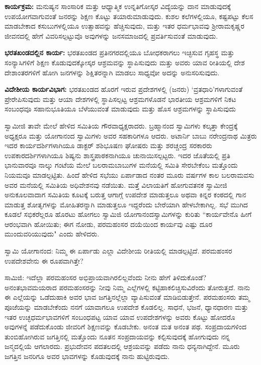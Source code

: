 \textbf{ಕಾರ್ಯಕ್ರಮ:} ಮನುಷ್ಯನ ಸಾಂಸಾರಿಕ ಮತ್ತು ಆಧ್ಯಾತ್ಮಿಕ ಉನ್ನತಿಗೋಸ್ಕರ ವಿದ್ಯೆಯನ್ನು ದಾನ ಮಾಡುವುದಕ್ಕೆ ಉಪಯೋಗವಾಗುವಂತೆ ಜನರನ್ನು ಶಿಕ್ಷಣ ಕೊಟ್ಟು ತಯಾರುಮಾಡುವುದು. ಕುಶಲ ಕಲೆಗಳಲ್ಲಿಯೂ, ಕಷ್ಟಪಟ್ಟು ಕೆಲಸ ಮಾಡಬೇಕಾದ ಕಸುಬುಗಳಲ್ಲಿಯೂ ಉತ್ಸಾಹವನ್ನು ಹೆಚ್ಚಿಸುವುದು, ಮತ್ತು ಇತರ ಧರ್ಮಭಾವವು ಶ‍್ರೀರಾಮಕೃಷ್ಣರ ಜೀವನದಲ್ಲಿ ಹೇಗೆ ವಿವರಿಸಲ್ಪಟ್ಟುವೊ ಅವುಗಳನ್ನು ಜನಸಮಾಜದಲ್ಲಿ ಪ್ರವರ್ತಿಸುವಂತೆ ಮಾಡುವುದು.

\textbf{ಭರತಖಂಡದಲ್ಲಿನ ಕಾರ್ಯ:} ಭರತಖಂಡದ ಪ್ರತಿನಗರದಲ್ಲಿಯೂ ಬೋಧಕರಾಗಲು ಇಚ್ಛಿಸುವ ಗೃಹಸ್ಥ ಮತ್ತು ಸಂನ್ಯಾಸಿಗಳಿಗೆ ಶಿಕ್ಷಣ ಕೊಡುವುದಕ್ಕೋಸ್ಕರ ಆಶ್ರಮವನ್ನು ಸ್ಥಾಪಿಸುವುದು ಮತ್ತು ಅವರು ಯಾವ ರೀತಿಯಲ್ಲಿ ದೇಶ ದೇಶಾಂತರಗಳಿಗೆ ಹೋಗಿ ಜನಗಳನ್ನು ಶಿಕ್ಷಿತರನ್ನಾಗಿ ಮಾಡಲು ಸಾಧ್ಯವೋ ಅದನ್ನು ಅನುಸರಿಸುವುದು.

\textbf{ವಿದೇಶೀಯ ಕಾರ್ಯವಿಭಾಗ:} ಭರತಖಂಡದ ಹೊರಗೆ ಇರುವ ಪ್ರದೇಶಗಳಲ್ಲಿ (ಜನರು) ‘ವ್ರತಧಾರಿ’ಗಳಾಗುವಂತೆ ಪ್ರೇರೇಪಿಸುವುದು ಮತ್ತು ಆಯಾ ದೇಶಗಳಲ್ಲಿ ಸ್ಥಾಪಿಸಲ್ಪಟ್ಟ ಆಶ್ರಮಗಳೊಡನೆ ಭಾರತೀಯ ಆಶ್ರಮಗಳಿಗೆ ನಿಕಟ ಸಂಬಂಧವೂ ಸಹಾನುಭೂತಿಯೂ ಬೆಳೆಯುವಂತೆ ಮಾಡುವುದು ಮತ್ತು ಹೊಸ ಆಶ್ರಮಗಳನ್ನು ಸ್ಥಾಪಿಸುವುದು

ಸ್ವಾಮೀಜಿ ತಾವೇ ಮೇಲೆ ಹೇಳಿದ ಸಮಿತಿಯ ಗೌರವಾಧ್ಯಕ್ಷರಾದರು. ಬ್ರಹ್ಮಾನಂದ ಸ್ವಾಮಿಗಳು ಕಲ್ಕತ್ತಾ ಕೇಂದ್ರಕ್ಕೆ ಅಧ್ಯಕ್ಷರೂ ಮತ್ತು ಯೋಗಾನಂದ ಸ್ವಾಮಿಗಳು ಅವರ ಸಹಕಾರಿಗಳೂ ಆದರು. ಅಟಾರ್ನಿ ಬಾಬು ನರೇಂದ್ರನಾಥ ಮಿತ್ರರು ಇದರ ಕಾರ್ಯದರ್ಶಿಗಳಾಗಿಯೂ ಡಾಕ್ಟರ್ ಶಶಿಭೂಷಣ ಘೋಷರು ಮತ್ತು ಶರಚ್ಚಂದ್ರ ಸರಕಾರರು ಉಪಕಾರದರ್ಶಿಗಳಾಗಿಯೂ ಶಿಷ್ಯನು ಶಾಸ್ತ್ರಪಾಠಕನಾಗಿಯೂ ಚುನಾಯಿಸಲ್ಪಟ್ಟರು. ಇದರ ಜೊತೆಯಲ್ಲಿ ಪ್ರತಿ ಭಾನುವಾರವೂ ನಾಲ್ಕು ಗಂಟೆಯ ಮೇಲೆ ಬಲರಾಮಬಾಬುಗಳ ಮನೆಯಲ್ಲಿ ಸಮಿತಿ ಸೇರಬೇಕೆಂಬ ಮತ್ತೊಂದು ನಿಯಮವೂ ಮಾಡಲ್ಪಟ್ಟಿತು. ಹಿಂದೆ ಹೇಳಿದ ಸಭೆಯು ಏರ್ಪಾಡಾದ ನಂತರ ಮೂರು ವರ್ಷಗಳ ಕಾಲ ಬಲರಾಮವಸು ಅವರ ಮನೆಯಲ್ಲಿ ಸಮಿತಿಯ ಅಧಿವೇಶನವು ನಡೆಯಿತು. ಮತ್ತೆ ವಿಲಾಯತಿಗೆ ಹೋಗುವತನಕ ಸ್ವಾಮೀಜಿ ಅನುಕೂಲವಾದಾಗ ಸಮಿತಿಯ ಕೂಟಕ್ಕೆ ಬರುತ್ತ ಆಗಾಗ್ಗೆ ಉಪದೇಶ ಮಾಡುತ್ತಲೂ ಅಥವಾ ಕಿನ್ನರ ಕಂಠದಲ್ಲಿ ಗಾನ ಮಾಡುತ್ತ ಶೋತೃಗಳನ್ನು ಮೋಹಿತರನ್ನಾಗಿ ಮಾಡುತ್ತಲೂ ಇದ್ದರೆಂದು ಬೇರೆಯಾಗಿ ಹೇಳಬೇಕಾಗಿಲ್ಲ. ಸಭೆ ಮುಗಿದ ಕೂಡಲೆ ಸಭಿಕರೆಲ್ಲರೂ ಹೊರಟು ಹೋಗಲು ಸ್ವಾಮಿಜಿ ಯೋಗಾನಂದಸ್ವಾಮಿಗಳನ್ನು ಕುರಿತು “ಕಾರ್ಯವೇನೊ ಹೀಗೆ ಆರಂಭವಾಗಿ ಹೋಯಿತು; ಈಗ ನೋಡು, ಪರಮಹಂಸರ ದಯೆಯಿಂದ ಕಾರ್ಯವು ಎಷ್ಟು ದೂರ ಮುಂದುವರಿಯುವುದು" ಎಂದು ಹೇಳಿದರು.

ಸ್ವಾಮಿ ಯೋಗಾನಂದ: ನಿಮ್ಮ ಈ ಏರ್ಪಾಡು ಎಲ್ಲಾ ವಿದೇಶೀಯ ರೀತಿಯಲ್ಲಿ ಮಾಡಲ್ಪಟ್ಟಿದೆ. ಪರಮಹಂಸರ ಉಪದೇಶವೇನು ಈ ರೂಪವಾಗಿತ್ತೇ?

ಸಾಮಿಜಿ: ಇದೆಲ್ಲಾ ಪರಮಹಂಸರ ಅಭಿಪ್ರಾಯವಾಗಿರಲಿಲ್ಲವೆಂದು ನೀನು ಹೇಗೆ ತಿಳಿದುಕೊಂಡೆ? ಅನಂತಭಾವಮಯರಾದ ಪರಮಹಂಸರನ್ನು ನೀವು ನಿಮ್ಮ ಎಲ್ಲೆಗಳಲ್ಲಿ ಕಟ್ಟಿಹಾಕಲಿಚ್ಚಿಸುವಿರೆಂದು ತೋರುತ್ತದೆ. ನಾನು ಈ ಎಲ್ಲೆಯನ್ನು ಒಡೆದುಹಾಕಿ ಅವರ ಭಾವ ಜಗತ್ತಿನಲ್ಲೆಲ್ಲಾ ವ್ಯಾಪಿಸುವಂತೆ ಮಾಡಿಬಿಡುತ್ತೇನೆ. ಪರಮಹಂಸರು ತಮ್ಮ ಪೂಜೆಯನ್ನು ಮಾಡಬೇಕೆಂದು ನನಗೆ ಯಾವಾಗಲೂ ಉಪದೇಶ ಕೊಡಲಿಲ್ಲ. ಸಾಧನೆ, ಭಜನೆ, ಧ್ಯಾನಧಾರಣ ಮತ್ತು ಇತರ ಉಚ್ಛಧರ್ಮಭಾವಗಳಿಗೆ ಸಂಬಂಧಪಟ್ಟ ಯಾವ ಯಾವ ಉಪದೇಶಗಳನ್ನು ಅವರು ಕೊಟ್ಟು ಹೋದರೊ ಅವುಗಳನ್ನೆ ಪಡೆದುಕೊಂಡು ಜೀವರಿಗೆ ಶಿಕ್ಷಣವನ್ನು ಕೊಡಬೇಕು. ಅನಂತ ಮತ ಅನಂತ ಪಥ. ಸಂಪ್ರದಾಯಗಳಿಂದ ತುಂಬಿಹೋಗಿರುವ ಜಗತ್ತಿನಲ್ಲಿ ಮತ್ತೊಂದು ನೂತನ ಸಂಪ್ರದಾಯವನ್ನು ಕಲ್ಪಿಸುವುದಕ್ಕೆ ಹೋಗುವುದು ನನ್ನ ಜನ್ಮದಲ್ಲಿಯೆ ಆಗಲಾರದು. ಪ್ರಭುದೇವನ ಪದತಲದಲ್ಲಿ ಆಶ್ರಯವನ್ನು ಪಡೆದು ನಾನು ಧನ್ಯನಾಗಿದ್ದೇನೆ. ಮೂರು ಜಗತ್ತಿನ ಜನರಿಗೂ ಅವರ ಭಾವಗಳನ್ನು ಕೊಡುವುದಕ್ಕೆ ನಾನು ಹುಟ್ಟಿರುವುದು.

